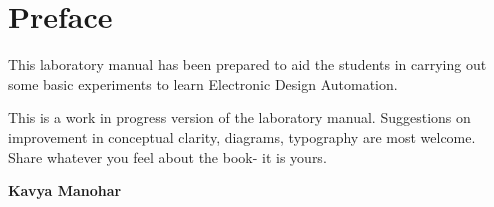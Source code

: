 \chapter*{Preface} 

This laboratory manual has been prepared to aid the students in carrying out some basic experiments to learn Electronic Design Automation.

This is a work in progress version of the laboratory manual. Suggestions on improvement in conceptual clarity, diagrams, typography are most welcome. Share whatever you feel about the book- it is yours.

\begin{flushright}
\textbf{Kavya Manohar}
\end{flushright}